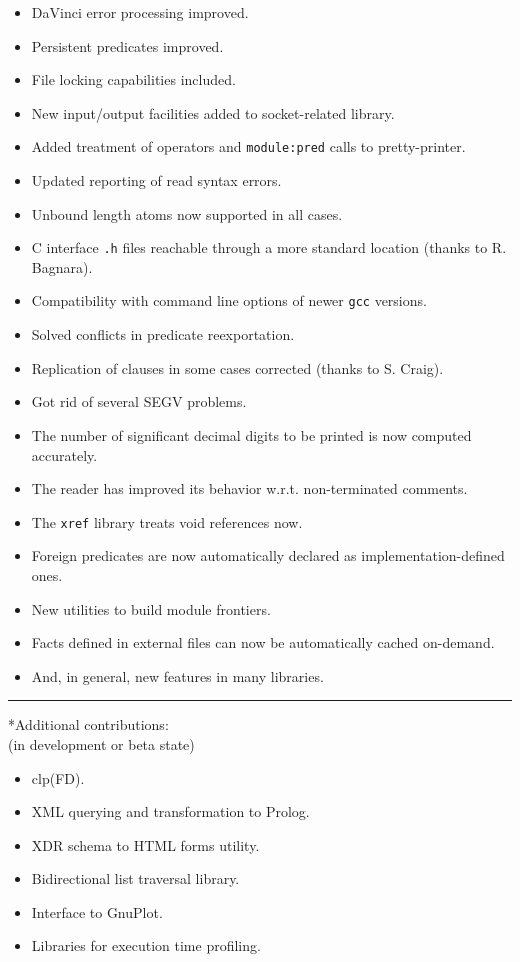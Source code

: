 \documentclass{article}
\makeatletter
\def\subsection{\@startsection{subsection}{2}{\z@}{-1.0ex plus -1ex minus 
 -.2ex}{0.7ex plus .2ex}{\normalsize\bf}}
\renewcommand{\baselinestretch}{0.95}
\newcommand{\myitems}{
\renewcommand{\baselinestretch}{0.5}
\parsep 0pt \parindent 0pt \itemsep -4pt \topsep -3pt }
\makeatother
\begin{document}
\begin{itemize}
\item DaVinci error processing improved.
\item Persistent predicates improved.
\item File locking capabilities included.
\item New input/output facilities added to socket-related library.
\item Added treatment of\- operators and 
      \texttt{module:pred} calls to pretty-printer.
\item Updated reporting of read syntax errors.
\item Unbound length atoms now supported in all cases.
\item C interface \texttt{.h} files reachable through a more standard
  location (thanks to R. Bagnara).
\item Compatibility with command line options of newer \texttt{gcc}
  versions.
\item Solved conflicts in predicate reexportation.
\item Replication of clauses in some cases corrected (thanks to
  S. Craig).
\item Got rid of several SEGV problems.
\item The number of significant decimal digits to be printed is now
  computed accurately.
\item The reader has improved its behavior w.r.t. non-terminated
  comments.
  
\item The \texttt{xref} library treats void references now.
\item Foreign predicates are now automatically declared as
  implementation-defined ones.
\item New utilities to build module frontiers.
\item Facts defined in external files can now be automatically cached
  on-demand.
\item And, in general, new features in many libraries.
\end{itemize}

\hrule

\subsection*{Additional contributions:\\ (in development or beta state)}
\begin{itemize}
\myitems
\item clp(FD).
\item XML querying and transformation to Prolog.
\item XDR schema to HTML forms utility.
\item Bidirectional list traversal library.
\item Interface to GnuPlot.
\item Libraries for execution time profiling.
\end{itemize}
\end{document}
